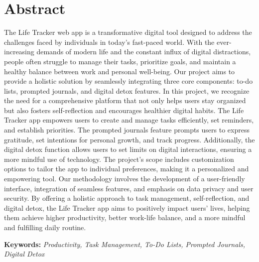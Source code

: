 \section*{Abstract}
The Life Tracker web app is a transformative digital tool designed to address the challenges faced by individuals in today's fast-paced world. With the ever-increasing demands of modern life and the constant influx of digital distractions, people often struggle to manage their tasks, prioritize goals, and maintain a healthy balance between work and personal well-being. Our project aims to provide a holistic solution by seamlessly integrating three core components: to-do lists, prompted journals, and digital detox features. In this project, we recognize the need for a comprehensive platform that not only helps users stay organized but also fosters self-reflection and encourages healthier digital habits. The Life Tracker app empowers users to create and manage tasks efficiently, set reminders, and establish priorities. The prompted journals feature prompts users to express gratitude, set intentions for personal growth, and track progress. Additionally, the digital detox function allows users to set limits on digital interactions, ensuring a more mindful use of technology. The project's scope includes customization options to tailor the app to individual preferences, making it a personalized and empowering tool. Our methodology involves the development of a user-friendly interface, integration of seamless features, and emphasis on data privacy and user security. By offering a holistic approach to task management, self-reflection, and digital detox, the Life Tracker app aims to positively impact users' lives, helping them achieve higher productivity, better work-life balance, and a more mindful and fulfilling daily routine.

\par
\vspace{0.5}
\textbf{Keywords:} \textit{ Productivity, Task Management, To-Do Lists, Prompted Journals, Digital Detox}